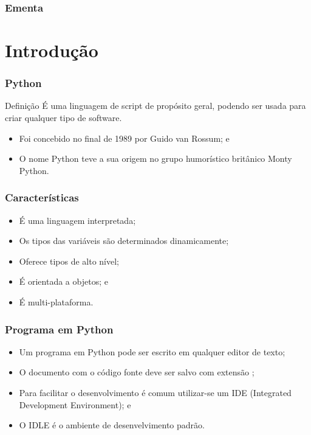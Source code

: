 \documentclass[aspectratio=169]{beamer} %
\begin{document}
\begin{frame}
	\frametitle{Ementa}
  	\tableofcontents
\end{frame}


\section{Introdução}

\begin{frame}
	\frametitle{Python}

	\begin{block}{Definição}
		É uma linguagem de script de propósito geral, podendo ser usada para criar
		qualquer tipo de software.
	\end{block}\vfill
	
	\begin{itemize}
		\item Foi concebido no final de 1989 por Guido van Rossum; e
		\item O nome Python teve a sua origem no grupo humorístico britânico
		Monty Python.
	\end{itemize}
\end{frame}

\begin{frame}
\frametitle{Características}

\begin{itemize}
	\item É uma linguagem interpretada;
	\item Os tipos das variáveis são determinados dinamicamente;
	\item Oferece tipos de alto nível;
	\item É orientada a objetos; e
	\item É multi-plataforma.
\end{itemize}
\end{frame}

\begin{frame}
\frametitle{Programa em Python}

\begin{itemize}
	\item Um programa em Python pode ser escrito em qualquer editor de texto;
	\item O documento com o código fonte deve ser salvo com extensão ;
	\item Para facilitar o desenvolvimento é comum utilizar-se um IDE
	(Integrated Development Environment); e
	\item O IDLE é o ambiente de desenvelvimento padrão.
\end{itemize}
\end{frame}
\end{document}
